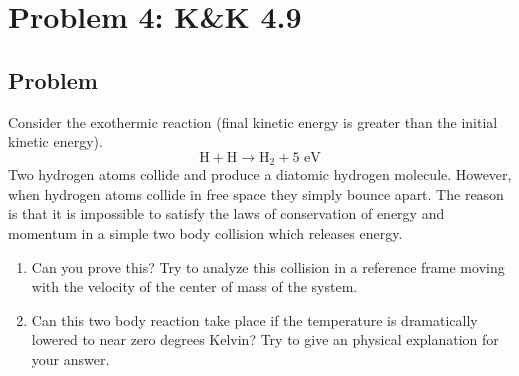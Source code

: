\documentclass[solutions]{esg8012pset}
\begin{document}
\begin{enumerate}[a)]
\end{enumerate}
\section*{Problem 4: K\&K 4.9}
\subsection*{Problem}
  Consider the exothermic reaction (final kinetic energy is greater than the initial kinetic energy).
  $$\text{H} + \text{H} \to \text{H}_2 + 5\text{ eV}$$
  Two hydrogen atoms collide and produce a diatomic hydrogen molecule. However, when hydrogen atoms collide in free space they simply bounce apart. The reason is that it is impossible to satisfy the laws of conservation of energy and momentum in a simple two body collision which releases energy.
  \begin{enumerate}
    \item Can you prove this? Try to analyze this collision in a reference frame moving with the velocity of the center of mass of the system.
    \item Can this two body reaction take place if the temperature is dramatically lowered to near zero degrees Kelvin? Try to give an physical explanation for your answer.
  \end{enumerate}
\end{document}
